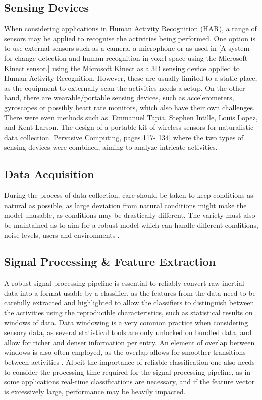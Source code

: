 
\subsection{Sensing Devices}
When considering applications in Human Activity Recognition (HAR),  a range of sensors may be applied to recognise the activities being performed.  
One option is to use external sensors such as a camera, a microphone or as used in [A system for change detection and human
recognition in voxel space using the Microsoft Kinect sensor.] using the Microsoft Kinect as a 3D sensing device applied to Human Activity Recognition. 
However, these are usually limited to a static place, as the equipment to externally scan the activities needs a setup. On the other hand, 
there are wearable/portable sensing devices, such as accelerometers, gyroscopes or possibly heart rate monitors, which also have their own challenges. There were even methods such as 
[Emmanuel Tapia, Stephen Intille, Louis Lopez, and Kent Larson. The design of a portable kit of wireless sensors for naturalistic data collection. Pervasive Computing, pages 117-
134] where the two types of sensing devices were combined, aiming to analyze intricate activities.
\subsection{Data Acquisition}

During the process of data collection, care should be taken to keep conditions as natural as possible, as large deviation from 
natural conditions might make the model unusable, as conditions may be drastically different. The variety must also be maintained as to aim for a robust model 
which can handle different conditions, noise levels, users and environments \cite{ReyesOrtiz2013HumanAA}.

\subsection{Signal Processing \& Feature Extraction}
A robust signal processing pipeline is essential to reliably convert raw inertial data into a format usable by a classifier, as the features from the data need to be carefully extracted and highlighted to allow the classifiers to distinguish between the activities using the reproducible characteristics, such as statistical results on windows of data. 
Data windowing is a very common practice when considering sensory data, as several statistical tools are only unlocked on bundled data, and allow for richer and denser information per entry. An element of overlap between windows is also often employed, as the overlap allows for smoother transitions between activities \cite{ReyesOrtiz2013HumanAA}.
Albeit the importance of reliable classification one also needs to consider the processing time required for the signal processing pipeline, as in some applications real-time classifications are necessary, and if the feature vector is excessively large, performance may be heavily impacted. 

